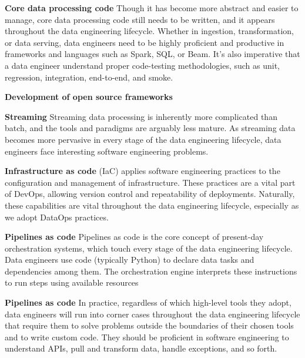 \documentclass[12pt]{book}
\begin{document}
\textbf{Core data processing code} Though it has become more abstract and easier to manage, core data
processing code still needs to be written, and it appears throughout the data
engineering lifecycle. Whether in ingestion, transformation, or data serving,
data engineers need to be highly proficient and productive in frameworks
and languages such as Spark, SQL, or Beam. It’s also imperative that a data engineer understand proper code-testing
methodologies, such as unit, regression, integration, end-to-end, and smoke.

\textbf{Development of open source frameworks} 

\textbf{Streaming} Streaming data processing is inherently more complicated than batch, and
the tools and paradigms are arguably less mature. As streaming data
becomes more pervasive in every stage of the data engineering lifecycle,
data engineers face interesting software engineering problems.

\textbf{Infrastructure as code} (IaC) applies software engineering practices to the
configuration and management of infrastructure. These practices are a vital part of DevOps, allowing version control and
repeatability of deployments. Naturally, these capabilities are vital
throughout the data engineering lifecycle, especially as we adopt DataOps
practices.

\textbf{Pipelines as code} Pipelines as code is the core concept of present-day orchestration systems,
which touch every stage of the data engineering lifecycle. Data engineers
use code (typically Python) to declare data tasks and dependencies among
them. The orchestration engine interprets these instructions to run steps
using available resources

\textbf{Pipelines as code} In practice, regardless of which high-level tools they adopt, data engineers
will run into corner cases throughout the data engineering lifecycle that
require them to solve problems outside the boundaries of their chosen tools
and to write custom code. They should be proficient in software engineering to understand APIs, pull and transform data, handle
exceptions, and so forth.

\end{document}
